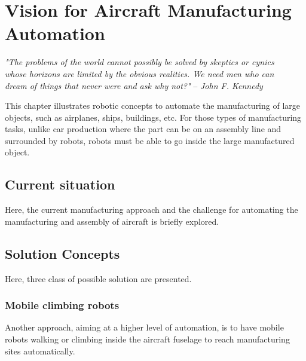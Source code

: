 \chapter{Vision for Aircraft Manufacturing Automation}
\label{sec:VisionForAircraftManufacturingAutomation}

\begin{flushright}
{
\textit{"The problems of the world cannot possibly be solved by skeptics or cynics \\ whose horizons are limited by the obvious realities. We need men who can  \\ dream of things that never were and ask why not?"}  -- \emph{John F. Kennedy}
%
}
\end{flushright}
\vspace{+10pt}

This chapter illustrates robotic concepts to automate the manufacturing of large objects, such as airplanes, ships, buildings, etc. For those types of manufacturing tasks, unlike car production where the part can be on an assembly line and surrounded by robots, robots must be able to go inside the large manufactured object. %


\section{Current situation}
\label{sec:CurrentSituation}

Here, the current manufacturing approach and the challenge for automating the manufacturing and assembly of aircraft is briefly explored.


\section{Solution Concepts}

Here, three class of possible solution are presented.




\subsection{Mobile climbing robots}
\label{sec:MobileClimbingRobots}

Another approach, aiming at a higher level of automation, is to have mobile robots walking or climbing inside the aircraft fuselage to reach manufacturing sites automatically. 


